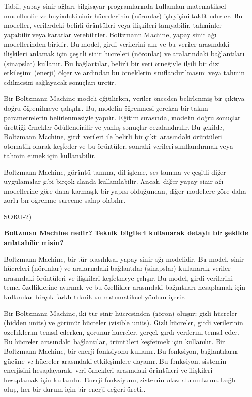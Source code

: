 \documentclass[11pt]{article}
\begin{document}
Tabii, yapay sinir ağları bilgisayar programlarında kullanılan matematiksel modellerdir ve beyindeki sinir hücrelerinin (nöronlar) işleyişini taklit ederler. Bu modeller, verilerdeki belirli örüntüleri veya ilişkileri tanıyabilir, tahminler yapabilir veya kararlar verebilirler.
Boltzmann Machine, yapay sinir ağı modellerinden biridir. Bu model, girdi verilerini alır ve bu veriler arasındaki ilişkileri anlamak için çeşitli sinir hücreleri (nöronlar) ve aralarındaki bağlantıları (sinapslar) kullanır. Bu bağlantılar, belirli bir veri örneğiyle ilgili bir dizi etkileşimi (enerji) ölçer ve ardından bu örneklerin sınıflandırılmasını veya tahmin edilmesini sağlayacak sonuçları üretir.

Bir Boltzmann Machine modeli eğitilirken, veriler önceden belirlenmiş bir çıktıya doğru öğrenilmeye çalışılır. Bu, modelin öğrenmesi gereken bir takım parametrelerin belirlenmesiyle yapılır. Eğitim sırasında, modelin doğru sonuçlar ürettiği örnekler ödüllendirilir ve yanlış sonuçlar cezalandırılır. Bu şekilde, Boltzmann Machine, girdi verileri ile belirli bir çıktı arasındaki örüntüleri otomatik olarak keşfeder ve bu örüntüleri sonraki verileri sınıflandırmak veya tahmin etmek için kullanabilir.

Boltzmann Machine, görüntü tanıma, dil işleme, ses tanıma ve çeşitli diğer uygulamalar gibi birçok alanda kullanılabilir. Ancak, diğer yapay sinir ağı modellerine göre daha karmaşık bir yapısı olduğundan, diğer modellere göre daha zorlu bir öğrenme sürecine sahip olabilir.

SORU-2) 

\textbf{Boltzman Machine nedir? Teknik bilgileri kullanarak detaylı bir şekilde anlatabilir misin?}

Boltzmann Machine, bir tür olasılıksal yapay sinir ağı modelidir. Bu model, sinir hücreleri (nöronlar) ve aralarındaki bağlantılar (sinapslar) kullanarak veriler arasındaki örüntüleri ve ilişkileri keşfetmeye çalışır. Bu model, girdi verilerini temel özelliklerine ayırmak ve bu özellikler arasındaki bağıntıları hesaplamak için kullanılan birçok farklı teknik ve matematiksel yöntem içerir.

Bir Boltzmann Machine, iki tür sinir hücresinden (nöron) oluşur: gizli hücreler (hidden units) ve görünür hücreler (visible units). Gizli hücreler, girdi verilerinin özelliklerini temsil ederken, görünür hücreler, gerçek girdi verilerini temsil eder. Bu hücreler arasındaki bağlantılar, örüntüleri keşfetmek için kullanılır.
Bir Boltzmann Machine, bir enerji fonksiyonu kullanır. Bu fonksiyon, bağlantıların gücüne ve hücreler arasındaki etkileşimlere dayanır. Bu fonksiyon, sistemin enerjisini hesaplayarak, veri örnekleri arasındaki örüntüleri ve ilişkileri hesaplamak için kullanılır. Enerji fonksiyonu, sistemin olası durumlarına bağlı olup, her bir durum için bir enerji değeri üretir.
\end{document}
